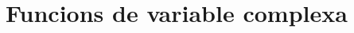 \documentclass[../Apunts.tex]{subfiles}
\begin{document}
		

\section{Funcions de variable complexa}
\end{document}
